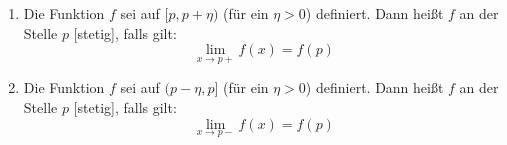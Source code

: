 \begin{enumerate}[leftmargin=*]
    \item Die Funktion $f$ sei auf $[p, p + \eta)$ (für ein $\eta > 0$) definiert. Dann heißt $f$ an der Stelle $p$ [stetig], falls gilt:
    $$\lim_{x \to p+} f(x) = f(p)$$
    \item Die Funktion $f$ sei auf $(p - \eta, p]$ (für ein $\eta > 0$) definiert. Dann heißt $f$ an der Stelle $p$ [stetig], falls gilt:
    $$\lim_{x \to p-} f(x) = f(p)$$
\end{enumerate}